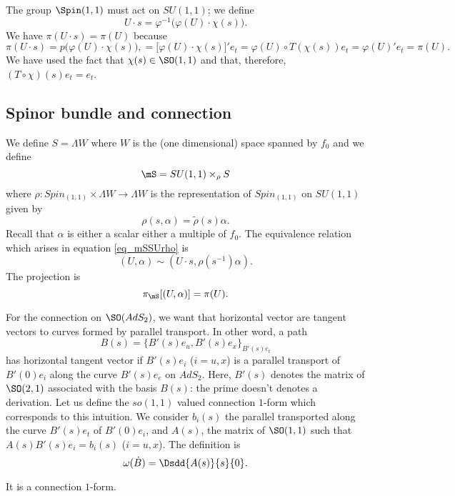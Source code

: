 The group $\Spin(1,1)$ must act on $SU(1,1)$; we define
\begin{equation}
	U\cdot s=\varphi^{-1}\big( \varphi(U)\cdot \chi(s) \big).
\end{equation}
We have $\pi(U\cdot s)=\pi(U)$ because
\[
	\pi(U\cdot s)=p\big( \varphi(U)\cdot\chi(s) \big),
	=\big[ \varphi(U)\cdot \chi(s) \big]'e_t
	=\varphi(U)\circ T(\chi(s))e_t
	=\varphi(U)'e_t
	=\pi(U).
\]
We have used the fact that  $\chi(s)\in \SO(1,1)$ and that, therefore, $(T\circ\chi)(s)e_t=e_t$.


\subsection{Spinor bundle and connection}

We define $S=\Lambda W$ where $W$ is the (one dimensional) space spanned by $f_0$ and we define
\begin{equation} \label{eq_mSSUrho}
	\mS= SU(1,1)\times_{\rho}S
\end{equation}
where $\rho\colon Spin_{(1,1)}\times\Lambda W\to \Lambda W$ is the representation of $Spin_{(1,1)}$ on $SU(1,1)$ given by
\begin{equation}
	\rho(s,\alpha)=\tilde\rho(s)\alpha.
\end{equation}
Recall that $\alpha$ is either a scalar either a multiple of $f_0$. The equivalence relation which arises in equation \eqref{eq_mSSUrho} is
\begin{equation}
	(U,\alpha)\sim(U\cdot s,\rho(s^{-1})\alpha).
\end{equation}
The projection is
\[
	\pi_{\mS}[(U,\alpha)]=\pi(U).
\]

For the connection on $\SO(AdS_2)$, we want that horizontal vector are tangent vectors to curves formed by parallel transport. In other word, a path
\[
	B(s)=\{ B'(s)e_u,B'(s)e_x \}_{B'(s)e_t}
\]
has horizontal tangent vector if $B'(s)e_i$ ($i=u,x$) is a parallel transport of $B'(0)e_i$ along the curve $B'(s)e_e$ on $AdS_2$. Here, $B'(s)$ denotes the matrix of $\SO(2,1)$ associated with the basis $B(s)$: the prime doesn't denotes a derivation. Let us define the $so(1,1)$ valued connection $1$-form which corresponds to this intuition. We consider $b_i(s)$ the parallel transported along the curve $B'(s)e_t$ of $B'(0)e_i$, and $A(s)$, the matrix of $\SO(1,1)$ such that $A(s)B'(s)e_i=b_i(s)$ ($i=u,x$). The definition is
\[
	\omega(\dot B)=\Dsdd{ A(s) }{s}{0}.
\]


\begin{proposition}
	It is a connection $1$-form.
\end{proposition}

